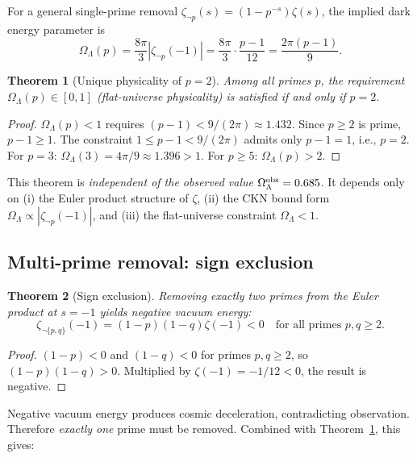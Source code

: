 \documentclass[11pt,a4paper]{article}
\newtheorem{theorem}{Theorem}
\begin{document}
For a general single-prime removal $\zeta_{\neg p}(s) =
(1 - p^{-s})\zeta(s)$, the implied dark energy parameter is
\begin{equation}
\Omega_\Lambda(p) = \frac{8\pi}{3}|\zeta_{\neg p}(-1)|
= \frac{8\pi}{3}\cdot\frac{p-1}{12} = \frac{2\pi(p-1)}{9}.
\end{equation}

\begin{theorem}[Unique physicality of $p = 2$]\label{th:unique}
Among all primes $p$, the requirement $\Omega_\Lambda(p) \in [0, 1]$
(flat-universe physicality) is satisfied if and only if $p = 2$.
\end{theorem}

\begin{proof}
$\Omega_\Lambda(p) < 1$ requires $(p-1) < 9/(2\pi) \approx 1.432$.
Since $p \geq 2$ is prime, $p - 1 \geq 1$. The constraint
$1 \leq p - 1 < 9/(2\pi)$ admits only $p - 1 = 1$, i.e., $p = 2$.
For $p = 3$: $\Omega_\Lambda(3) = 4\pi/9 \approx 1.396 > 1$.
For $p \geq 5$: $\Omega_\Lambda(p) > 2$.
\end{proof}

This theorem is \emph{independent of the observed value}
$\Omega_\Lambda^{\rm obs} = 0.685$. It depends only on (i) the
Euler product structure of $\zeta$, (ii) the CKN bound form
$\Omega_\Lambda \propto |\zeta_{\neg p}(-1)|$, and (iii) the
flat-universe constraint $\Omega_\Lambda < 1$.

\subsection{Multi-prime removal: sign exclusion}

\begin{theorem}[Sign exclusion]\label{th:sign}
Removing exactly two primes from the Euler product at $s = -1$
yields \emph{negative} vacuum energy:
\begin{equation}
\zeta_{\neg\{p,q\}}(-1) = (1-p)(1-q)\zeta(-1) < 0
\quad \text{for all primes } p, q \geq 2.
\end{equation}
\end{theorem}

\begin{proof}
$(1-p) < 0$ and $(1-q) < 0$ for primes $p, q \geq 2$, so
$(1-p)(1-q) > 0$. Multiplied by $\zeta(-1) = -1/12 < 0$, the
result is negative.
\end{proof}

Negative vacuum energy produces cosmic deceleration, contradicting
observation. Therefore \emph{exactly one} prime must be removed.
Combined with Theorem~\ref{th:unique}, this gives:
\end{document}

